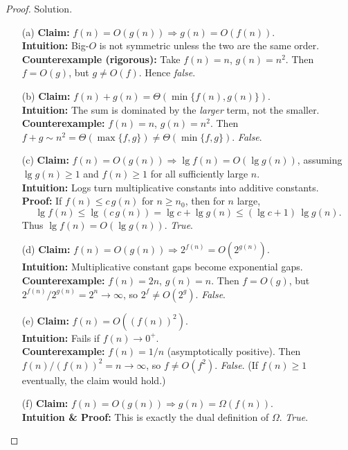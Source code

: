 \documentclass[12pt]{article}
\theoremstyle{definition}
\begin{document}
\begin{proof}
Solution. \\

\begin{enumerate}
\item[(a)] \textbf{Claim:} $f(n)=O(g(n)) \Rightarrow g(n)=O(f(n))$.\\
\textbf{Intuition:} Big-$O$ is not symmetric unless the two are the same order.\\
\textbf{Counterexample (rigorous):} Take $f(n)=n$, $g(n)=n^2$. Then $f=O(g)$, but $g\neq O(f)$. Hence \emph{false}.

\item[(b)] \textbf{Claim:} $f(n)+g(n)=\Theta(\min\{f(n),g(n)\})$.\\
\textbf{Intuition:} The sum is dominated by the \emph{larger} term, not the smaller.\\
\textbf{Counterexample:} $f(n)=n$, $g(n)=n^2$. Then $f+g\sim n^2=\Theta(\max\{f,g\})\neq \Theta(\min\{f,g\})$. \emph{False}.

\item[(c)] \textbf{Claim:} $f(n)=O(g(n)) \Rightarrow \lg f(n)=O(\lg g(n))$, assuming $\lg g(n)\ge1$ and $f(n)\ge1$ for all sufficiently large $n$.\\
\textbf{Intuition:} Logs turn multiplicative constants into additive constants.\\
\textbf{Proof:} If $f(n)\le c\,g(n)$ for $n\ge n_0$, then for $n$ large,
\[
\lg f(n)\le \lg(c\,g(n))=\lg c+\lg g(n)\le (\lg c+1)\,\lg g(n).
\]
Thus $\lg f(n)=O(\lg g(n))$. \emph{True}.

\item[(d)] \textbf{Claim:} $f(n)=O(g(n)) \Rightarrow 2^{f(n)}=O(2^{g(n)})$.\\
\textbf{Intuition:} Multiplicative constant gaps become exponential gaps.\\
\textbf{Counterexample:} $f(n)=2n$, $g(n)=n$. Then $f=O(g)$, but $2^{f(n)}/2^{g(n)}=2^{n}\to\infty$, so $2^{f}\neq O(2^{g})$. \emph{False}.

\item[(e)] \textbf{Claim:} $f(n)=O((f(n))^2)$.\\
\textbf{Intuition:} Fails if $f(n)\to0^+$.\\
\textbf{Counterexample:} $f(n)=1/n$ (asymptotically positive). Then $f(n)/(f(n))^2 = n\to\infty$, so $f\neq O(f^2)$. \emph{False}. (If $f(n)\ge1$ eventually, the claim would hold.)

\item[(f)] \textbf{Claim:} $f(n)=O(g(n)) \Rightarrow g(n)=\Omega(f(n))$.\\
\textbf{Intuition \& Proof:} This is exactly the dual definition of $\Omega$. \emph{True}.


\end{enumerate}
\end{proof}
\end{document}
